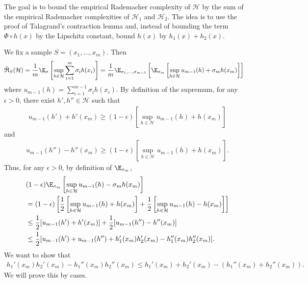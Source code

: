 \begin{enumerate}
    The goal is to bound the empirical Rademacher complexity
    of $\mathcal{H}$ by the sum of the empirical Rademacher
    complexities of $\mathcal{H}_1$ and $\mathcal{H}_2$.
    The idea is to use the proof of Talagrand's contraction lemma 
    and, instead of bounding the term $\Phi \circ h(x)$ by the Lipschitz constant,
    bound $h(x)$ by $h_1(x) + h_2(x)$.

    We fix a sample $S=(x_1, \ldots, x_m)$.
    Then
    \begin{align}
        \hat{\mathfrak{R}}_S(\mathcal{H})
        &= \frac{1}{m} \E_\sigma \left[
        \sup_{h \in \mathcal{H}}
        \sum_{i=1}^m \sigma_i h(x_i)
        \right] = \frac{1}{m} \E_{\sigma_1,\ldots,\sigma_{m-1}}
        \left[ \E_{\sigma_m} \left[
        \sup_{h \in \mathcal{H}}
        u_{m-1}(h) + \sigma_m h(x_m)
        \right] \right]
        \nonumber
    \end{align}
    where $u_{m-1}(h) = \sum_{i=1}^{m-1}\sigma_i h(x_i)$.
    By definition of the supremum, for any $\epsilon>0$,
    there exist $h', h'' \in \mathcal{H}$ such that
    \begin{align}
        u_{m-1}(h') +h'(x_m)
        \geq (1-\epsilon)
        \left[
        \sup_{h \in \mathcal{H}}
        u_{m-1}(h) + h(x_m)
        \right]
        \nonumber
    \end{align}
    and 
    \begin{align}
        \label{eq:achievespp}
        u_{m-1}(h'') - h''(x_m)
        \geq (1-\epsilon)
        \left[
        \sup_{h \in \mathcal{H}}
        u_{m-1}(h) + h(x_m)
        \right].
    \end{align}
    Thus, for any $\epsilon > 0$, by definition
    of $\E_{\sigma_m}$,
    \begin{align}
        &(1-\epsilon) \E_{\sigma_m} \left[
        \sup_{h \in \mathcal{H}}
        u_{m-1}(h) - \sigma_m h(x_m)
        \right] \nonumber \\
        &= (1-\epsilon) \left[
        \frac{1}{2} \left[
        \sup_{h \in \mathcal{H}}
        u_{m-1}(h) + h(x_m)
        \right]
        + \frac{1}{2} \left[
        \sup_{h \in \mathcal{H}}
        u_{m-1}(h) - h(x_m)
        \right] \right] \nonumber \\
        &\leq \frac{1}{2}
        [u_{m-1}(h') + h'(x_m)]
        + \frac{1}{2}
        [u_{m-1}(h'') - h''(x_m)]
        \nonumber \\
        &\leq \frac{1}{2}
        [u_{m-1}(h') + u_{m-1}(h'')
        + h_1'(x_m)h_2'(x_m) - h_1''(x_m)h_2''(x_m)].
        \label{eq:preineq}
    \end{align}
    We want to show that
    \begin{align}\label{eq:inequality}
        h_1'(x_m)h_2'(x_m) - h_1''(x_m)h_2''(x_m)
        \leq h_1'(x_m) + h_2'(x_m) - (h_1''(x_m) + h_2''(x_m)).
    \end{align}
    We will prove this by cases.
    

\end{enumerate}
